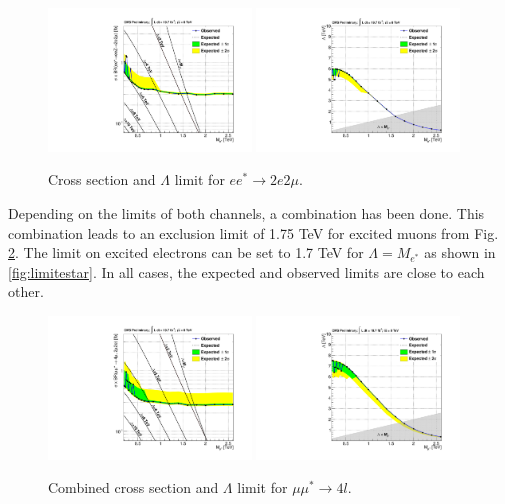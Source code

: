 \begin{figure}[hp!]
\begin{center}
\includegraphics[width=0.48\textwidth]{plot/limit_2e2mu.pdf}
\includegraphics[width=0.48\textwidth]{plot/limit_lambda_2e2mu.pdf}
\end{center}
\caption{\label{fig:limit2e2mu}Cross section and $\Lambda$ limit for $e e^{*} \rightarrow 2e 2\mu$.}
\end{figure}

Depending on the limits of both channels, a combination has been done. This combination leads to an exclusion limit of 1.75 TeV for excited muons from Fig. \ref{fig:limitmustar}. The limit on excited electrons can be set to 1.7 TeV for $\Lambda = M_{e^{*}}$ as shown in \ref{fig:limitestar}. In all cases, the expected and observed limits are close to each other.

\begin{figure}[hp!]
\begin{center}
\includegraphics[width=0.48\textwidth]{plot/limit_combined_mustar.pdf}
\includegraphics[width=0.48\textwidth]{plot/limit_lambda_combined_mustar.pdf}
\end{center}
\caption{\label{fig:limitmustar}Combined cross section and $\Lambda$ limit for $\mu\mu^{*} \rightarrow 4l$.}
\end{figure}

